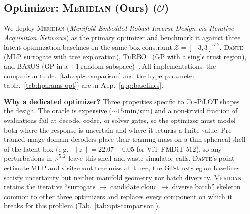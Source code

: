 \documentclass{article}
\newcommand{\Co}{\textsc{Co-PiLOT}}
\newcommand{\meridian}{\textsc{Meridian}}
\newcommand{\dante}{\textsc{Dante}}
\newcommand{\turbo}{\textsc{TuRBO}}
\newcommand{\baxus}{\textsc{BAxUS}}
\newcommand{\Z}{\mathcal{Z}}
\newcommand{\Opt}{\mathcal{O}}
\newcommand{\R}{\mathbb{R}}
\begin{document}
\subsection{Optimizer: \meridian{} (Ours) ($\Opt$)}
\label{sec:optimizers}
\label{sec:meridian}

We deploy \meridian{} (\emph{Manifold-Embedded Robust Inverse Design via Iterative Acquisition Networks}) as the primary optimizer and benchmark it against three latent-optimization baselines on the same box constraint $\Z = [-3,3]^{512}$.  \dante{}~\citep{wei2025} (MLP surrogate with tree exploration), \turbo{}~\citep{eriksson2019} (GP with a single trust region), and \baxus{} (GP in a $\pm 1$ random subspace)~\citep{papenmeier2022}. All implementations: the comparison table.~\ref{tab:opt-comparison} and the hyperparameter table.~\ref{tab:hparams-opt}) are in App.~\ref{app:baselines}.

\textbf{Why a dedicated optimizer?} Three properties specific to \Co{} shapes the design. The oracle is expensive ($\sim 15$\,min/sim) and a non-trivial fraction of evaluations fail at decode, codec, or solver gates, so the optimizer must model both where the response is uncertain and where it returns a finite value. Pre-trained image-domain decoders place their training mass on a thin spherical shell of the latent box (e.g.\ $\| z\| {=} 22.07{\pm}0.05$ for ViT-FMDiT-$512$), so any perturbations in $\R^{512}$ leave this shell and waste simulator calls. \dante{}'s point-estimate MLP and visit-count tree miss all three; the GP-trust-region baselines satisfy uncertainty but neither manifold geometry nor batch diversity. \meridian{} retains the iterative ``surrogate $\to$ candidate cloud $\to$ diverse batch'' skeleton common to other three optimizers and replaces every component on which it breaks for this problem (Tab.~\ref{tab:opt-comparison}).
\end{document}
